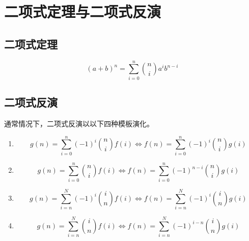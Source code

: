 \section{二项式定理与二项式反演}

\subsection{二项式定理}

$$(a+b)^n = \sum_{i=0}^n \binom{n}{i} a^i b^{n-i}$$

\subsection{二项式反演}

通常情况下，二项式反演以以下四种模板演化。

\begin{enumerate}
    \item $$g(n) = \sum_{i=0}^n (-1)^i \binom{n}{i} f(i) \iff f(n) = \sum_{i=0}^n (-1)^i \binom{n}{i} g(i) $$
    \item $$g(n) = \sum_{i=0}^n \binom{n}{i} f(i) \iff f(n) = \sum_{i=0}^n (-1)^{n-i} \binom{n}{i} g(i)$$
    \item $$g(n) = \sum_{i=n}^N (-1)^i \binom{i}{n} f(i) \iff f(n) = \sum_{i=n}^N (-1)^i \binom{i}{n} g(i)$$
    \item $$g(n) = \sum_{i=n}^N \binom{i}{n} f(i) \iff f(n) = \sum_{i=n}^N (-1)^{i-n} \binom{i}{n} g(i)$$
\end{enumerate}
